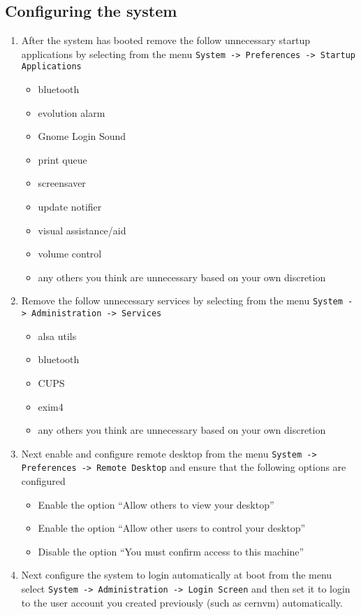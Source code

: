 \subsection{Configuring the system}
\label{sec:debianconfig}
\begin{enumerate}
\item	After the system has booted remove the follow unnecessary startup applications by selecting from the menu  
		\verb|System -> Preferences -> Startup Applications|
\begin{itemize}
\item	bluetooth
\item	evolution alarm
\item	Gnome Login Sound
\item	print queue
\item	screensaver
\item	update notifier
\item	visual assistance/aid
\item	volume control
\item	any others you think are unnecessary based on your own discretion
\end{itemize}

\item Remove the follow unnecessary services by selecting from the menu \verb|System -> Administration -> Services|
\begin{itemize}
\item	alsa utils
\item	bluetooth
\item	CUPS
\item	exim4
\item	any others you think are unnecessary based on your own discretion
\end{itemize}

\item Next enable and configure remote desktop from the menu \verb|System -> Preferences -> Remote Desktop| and ensure
that the following options are configured
\begin{itemize}
\item	Enable the option ``Allow others to view your desktop''
\item	Enable the option ``Allow other users to control your desktop''
\item	Disable the option ``You must confirm access to this machine''
\end{itemize}

\item Next configure the system to login automatically at boot from the menu select \verb|System -> Administration -> Login Screen|
and then set it to login to the user account you created previously (such as cernvm) automatically.


\end{enumerate}
